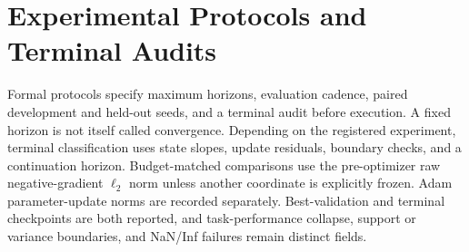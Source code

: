 \section{Experimental Protocols and Terminal Audits}
\label{app:protocols}

Formal protocols specify maximum horizons, evaluation cadence, paired development and held-out seeds, and a terminal audit before execution. A fixed horizon is not itself called convergence. Depending on the registered experiment, terminal classification uses state slopes, update residuals, boundary checks, and a continuation horizon. Budget-matched comparisons use the pre-optimizer raw negative-gradient $\ell_2$ norm unless another coordinate is explicitly frozen. Adam parameter-update norms are recorded separately. Best-validation and terminal checkpoints are both reported, and task-performance collapse, support or variance boundaries, and NaN/Inf failures remain distinct fields.
